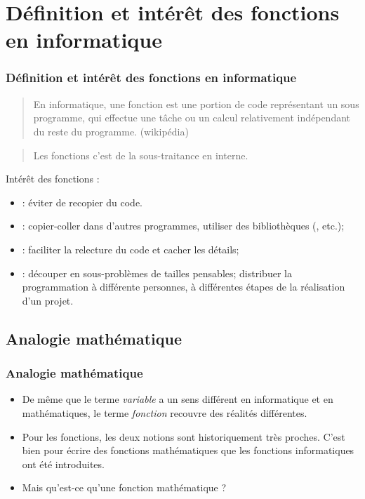 \documentclass[xcolor=pdftex,svgnames,table]{beamer}
\begin{document}
\section[Introduction]{Définition et intérêt des fonctions en informatique}
\begin{frame}
  \frametitle{Définition et intérêt des fonctions en informatique}
  \begin{quote}
    En informatique, une fonction est une portion de code représentant
    un sous programme, qui effectue une tâche ou un calcul
    relativement indépendant du reste du programme. (wikipédia)
  \end{quote}
\pause
\begin{quote}
  Les fonctions c'est de la sous-traitance en interne.
\end{quote}
\pause
Intérêt des fonctions :
  \begin{itemize}
  \item {} : éviter de recopier du code.\pause
    \item {} : copier-coller dans d'autres
      programmes, utiliser des bibliothèques (, etc.);\pause
    \item {} : faciliter la relecture du code et cacher les détails;\pause
    \item {} : découper en sous-problèmes de
      tailles pensables;  distribuer la programmation à différente personnes, à
      différentes étapes de la réalisation d'un projet.\pause
  \end{itemize}
\end{frame}

\subsection{Analogie mathématique}
\begin{frame}
  \frametitle{Analogie mathématique \nowrite}
 \begin{itemize}
\item De même que le terme \emph{variable} a un sens
    différent en informatique et en mathématiques, le terme
    \emph{fonction} recouvre des réalités différentes.

\item Pour les fonctions, les deux notions sont historiquement très
    proches. C'est bien pour écrire des fonctions mathématiques que
    les fonctions informatiques ont été introduites.

\item Mais qu'est-ce qu'une fonction mathématique ?
 \end{itemize}
\end{frame}
\end{document}
